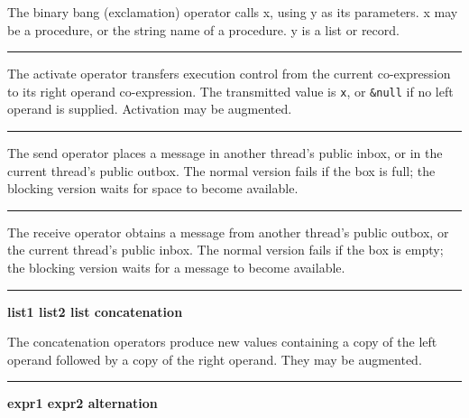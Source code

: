 \noindent
{}The binary bang (exclamation) operator calls x,
using y as its parameters.  x may be a procedure, or the string name of
a procedure.  y is a list or record.

\bigskip\hrule\vspace{0.1cm}

\noindent The activate operator transfers execution
control from the current co-expression to its right operand
co-expression. The transmitted value is \texttt{x}, or \texttt{\&null}
if no left operand is supplied. Activation may be augmented.

\bigskip\hrule\vspace{0.1cm}
 \linebreak
{}

\noindent The send operator places a message in another thread's public
inbox, or in the current thread's public outbox. The normal version fails
if the box is full; the blocking version waits for space to become
available.

\bigskip\hrule\vspace{0.1cm}
 \linebreak
{}

\noindent The receive operator obtains a message from another thread's public
outbox, or the current thread's public inbox. The normal version fails
if the box is empty; the blocking version waits for a message to become
available.

\bigskip\hrule\vspace{0.1cm}

\noindent
{\bf list1 {\textbar}{\textbar}{\textbar} list2 \hfill list concatenation}

\noindent The concatenation operators produce new values
containing a copy of the left operand followed by a copy of the right
operand. They may be augmented.

\bigskip\hrule\vspace{0.1cm}

\noindent
{\bf expr1 {\textbar} expr2 \hfill alternation}

